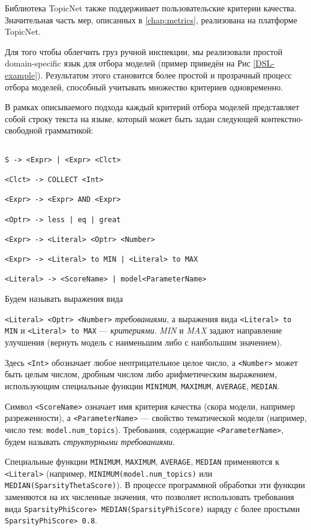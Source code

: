 Библиотека TopicNet также поддерживает пользовательские критерии качества. Значительная часть мер, описанных в \ref{chap:metrics}, реализована на платформе TopicNet.  

Для того чтобы облегчить груз ручной инспекции, мы реализовали простой domain-specific язык для отбора моделей (пример приведён на Рис \ref{DSL-example}). Результатом этого становится более простой и прозрачный процесс отбора моделей, способный учитывать множество критериев одновременно.  

В рамках описываемого подхода каждый критерий отбора моделей представляет собой строку текста на языке, который может быть задан следующей контекстно-свободной грамматикой: 

\begin{lstlisting}

S -> <Expr> | <Expr> <Clct>

<Clct> -> COLLECT <Int>

<Expr> -> <Expr> AND <Expr>

<Optr> -> less | eq | great

<Expr> -> <Literal> <Optr> <Number>

<Expr> -> <Literal> to MIN | <Literal> to MAX

<Literal> -> <ScoreName> | model<ParameterName>

\end{lstlisting} 

Будем называть выражения вида

\lstinline{<Literal> <Optr> <Number>} \textit{требованиями}, а выражения вида \lstinline{<Literal> to MIN} и \lstinline{<Literal> to MAX} --- \textit{критериями}. \textit{MIN} и \textit{MAX} задают направление улучшения (вернуть модель с наименьшим либо с наибольшим значением).  

Здесь \lstinline{<Int>} обозначает любое неотрицательное целое число, а \lstinline{<Number>} может быть целым числом, дробным числом либо арифметическим выражением, использующим специальные функции \texttt{MINIMUM}, \texttt{MAXIMUM}, \texttt{AVERAGE}, \texttt{MEDIAN}.  

Символ \lstinline{<ScoreName>} означает имя критерия качества (скора модели, например разреженности), а \lstinline{<ParameterName>} --- свойство тематической модели (например, число тем: \texttt{model.num\_topics}). Требования, содержащие \lstinline{<ParameterName>}, будем называть \textit{структурными требованиями}.  

Специальные функции \texttt{MINIMUM}, \texttt{MAXIMUM}, \texttt{AVERAGE}, \texttt{MEDIAN} применяются к \lstinline{<Literal>} (например, \texttt{MINIMUM(model.num\_topics)} или \texttt{MEDIAN(SparsityThetaScore)}). В процессе программной обработки эти функции заменяются на их численные значения, что позволяет использовать требования вида \texttt{SparsityPhiScore\@word > MEDIAN(SparsityPhiScore\@word)} наряду с более простыми \texttt{SparsityPhiScore\@word > 0.8}.  

